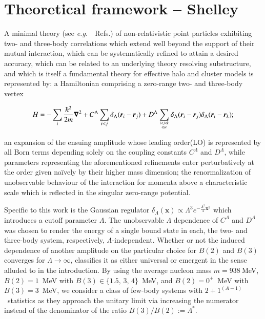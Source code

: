 \documentclass[preprint,12pt]{elsarticle}
\newcommand{\abb}{\ensuremath{2\!+\!1^{(A-1)}}}
\newcommand{\lec}{C^\Lambda}
\newcommand{\led}{D^\Lambda}
\newcommand{\eg}{\textit{e.g.}~}
\newcommand{\ve}[1]{\ensuremath{\boldsymbol{#1}}}
\begin{document}
\section{Theoretical framework -- Shelley}

A minimal theory (see \eg~Refs.\cite{Lepage:1997cs,vanKolck:1999mw, Bedaque:1998kg, Braaten:2004rn, Hammer:2017tjm, 
Hammer:2019poc}) of non-relativistic point particles exhibiting two- and three-body correlations which extend
well beyond the support of their mutual interaction, which can be systematically refined to attain a desired accuracy,
which can be related to an underlying theory resolving substructure,
and which is itself a fundamental theory for effective halo and cluster models
is represented by: a Hamiltonian comprising a zero-range two- and three-body
vertex

\begin{equation}
H = - \sum_i \frac{\hbar^2}{2m}\ve{\nabla}^2+ \lec \sum_{i<j}{\delta_\Lambda(\ve{r}_i-\ve{r}_j)} 
+ \led \sum_{ i<j<k \atop \text{cyc} }\delta_\Lambda(\ve{r}_i-\ve{r}_j)\delta_\Lambda(\ve{r}_i-\ve{r}_k);
\label{eq:hamiltonian}
\end{equation}

an expansion of the ensuing amplitude whose leading order(LO) is represented by all Born terms
depending solely on the coupling constants $\lec$ and $\led$, while parameters representing the aforementioned
refinements enter perturbatively at the order given na\"ively by their higher mass dimension;
the renormalization of unobservable behaviour of the interaction for momenta above a characteristic scale
which is reflected in the singular zero-range potential.

Specific to this work is the Gaussian regulator 
\mbox{$\delta_\Lambda(\ve{x}) \propto\Lambda^3 e^{-\frac{\Lambda^2}{4}\ve{x}^2}$}
which introduces a cutoff parameter $\Lambda$.
The unobservable $\Lambda$ dependence of $\lec$ and $\led$ was chosen to render
the energy of a single bound state in each, the two- and three-body system, respectively, $\Lambda$-independent.
Whether or not the induced dependence of another amplitude on the particular choice for $B(2)$ and $B(3)$
converges for $\Lambda\to\infty$, classifies it as either universal or emergent in the sense alluded to in the introduction.
By using the average nucleon mass $m=938~$MeV,
$B(2)=1$~MeV with $B(3)\in\lbrace1.5,\,3,\,4\rbrace$~MeV, and $B(2)=0^+$~MeV with $B(3)=3$~MeV, we
consider a class of few-body systems with \abb~statistics as they 
approach the unitary limit via increasing the numerator instead of the denominator of the
ratio $B(3)/B(2):=\Lambda^*$.
\end{document}
